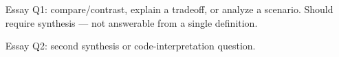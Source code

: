 \documentclass{article}
\newif\ifanswers
\begin{document}
\begin{enumerate}[resume]

\needspace{3in}
\item [Essay Q1: compare/contrast, explain a tradeoff, or analyze a scenario.
       Should require synthesis --- not answerable from a single definition.]
\ifanswers
  \par\medskip\noindent\textbf{Model answer:}
  [Write a complete answer usable as a grading rubric.]
  \par Full credit requires [specific criterion A] AND [specific criterion B].
  \par Partial credit for [partial criterion].
\else
  \vspace{2.5in}
\fi

\needspace{3in}
\item [Essay Q2: second synthesis or code-interpretation question.]
\ifanswers
  \par\medskip\noindent\textbf{Model answer:}
  [Write a complete answer usable as a grading rubric.]
  \par Full credit requires [specific criterion A] AND [specific criterion B].
  \par Partial credit for [partial criterion].
\else
  \vspace{2.5in}
\fi

\end{enumerate}
\end{document}
